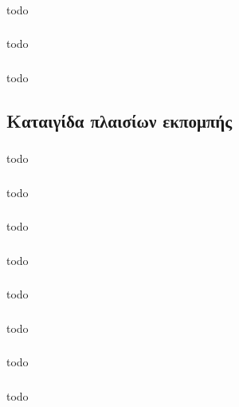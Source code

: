 \documentclass[a4paper, 12pt]{article}
\begin{document}
		\subsubsection{}
			todo

		\subsubsection{}
			todo

		\subsubsection{}
			todo

	\subsection{Καταιγίδα πλαισίων εκπομπής}

		\subsubsection{}
			todo

		\subsubsection{}
			todo

		\subsubsection{}
			todo

		\subsubsection{}
			todo

		\subsubsection{}
			todo

		\subsubsection{}
			todo

		\subsubsection{}
			todo

		\subsubsection{}
			todo
\end{document}
